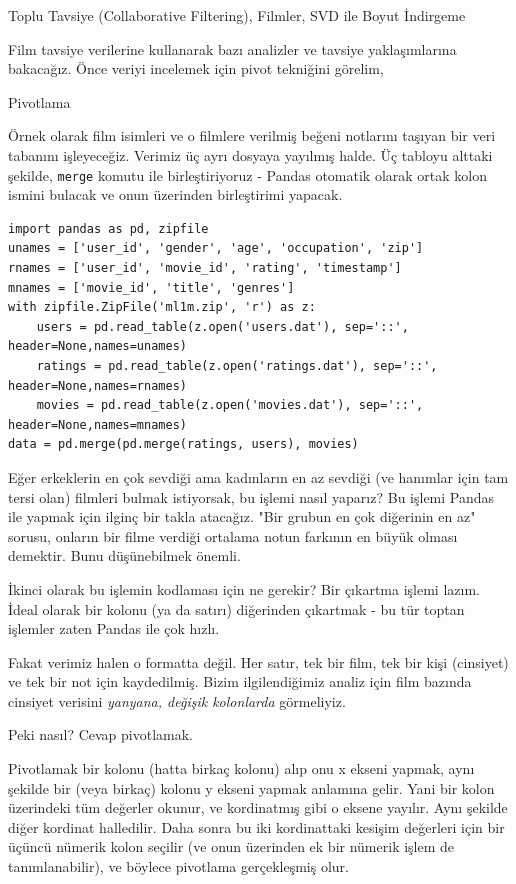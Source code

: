 \documentclass[12pt,fleqn]{article}\usepackage{../../common}
\begin{document}
Toplu Tavsiye (Collaborative Filtering), Filmler, SVD ile Boyut İndirgeme

Film tavsiye verilerine kullanarak bazı analizler ve tavsiye yaklaşımlarına
bakacağız. Önce veriyi incelemek için pivot tekniğini görelim,

Pivotlama

Örnek olarak film isimleri ve o filmlere verilmiş beğeni notlarını
taşıyan bir veri tabanını işleyeceğiz. Verimiz üç ayrı dosyaya
yayılmış halde. Üç tabloyu alttaki şekilde, \verb!merge! komutu
ile birleştiriyoruz - Pandas otomatik olarak ortak kolon ismini
bulacak ve onun üzerinden birleştirimi yapacak.

\begin{verbatim}
import pandas as pd, zipfile
unames = ['user_id', 'gender', 'age', 'occupation', 'zip']
rnames = ['user_id', 'movie_id', 'rating', 'timestamp']
mnames = ['movie_id', 'title', 'genres']
with zipfile.ZipFile('ml1m.zip', 'r') as z:
    users = pd.read_table(z.open('users.dat'), sep='::', header=None,names=unames)
    ratings = pd.read_table(z.open('ratings.dat'), sep='::', header=None,names=rnames)
    movies = pd.read_table(z.open('movies.dat'), sep='::', header=None,names=mnames)
data = pd.merge(pd.merge(ratings, users), movies)
\end{verbatim}

Eğer erkeklerin en çok sevdiği ama kadınların en az sevdiği (ve
hanımlar için tam tersi olan) filmleri bulmak istiyorsak, bu işlemi
nasıl yaparız? Bu işlemi Pandas ile yapmak için ilginç bir takla
atacağız. "Bir grubun en çok diğerinin en az" sorusu, onların bir
filme verdiği ortalama notun farkının en büyük olması demektir. Bunu
düşünebilmek önemli.

İkinci olarak bu işlemin kodlaması için ne gerekir? Bir çıkartma
işlemi lazım. İdeal olarak bir kolonu (ya da satırı) diğerinden
çıkartmak - bu tür toptan işlemler zaten Pandas ile çok hızlı.

Fakat verimiz halen o formatta değil.  Her satır, tek bir film, tek bir
kişi (cinsiyet) ve tek bir not için kaydedilmiş. Bizim ilgilendiğimiz
analiz için film bazında cinsiyet verisini {\em yanyana, değişik
  kolonlarda} görmeliyiz.

Peki nasıl? Cevap pivotlamak.

Pivotlamak bir kolonu (hatta birkaç kolonu) alıp onu x ekseni yapmak,
aynı şekilde bir (veya birkaç) kolonu y ekseni yapmak anlamına
gelir. Yani bir kolon üzerindeki tüm değerler okunur, ve kordinatmış
gibi o eksene yayılır. Aynı şekilde diğer kordinat halledilir. Daha
sonra bu iki kordinattaki kesişim değerleri için bir üçüncü nümerik
kolon seçilir (ve onun üzerinden ek bir nümerik işlem de
tanımlanabilir), ve böylece pivotlama gerçekleşmiş olur.
\end{document}
